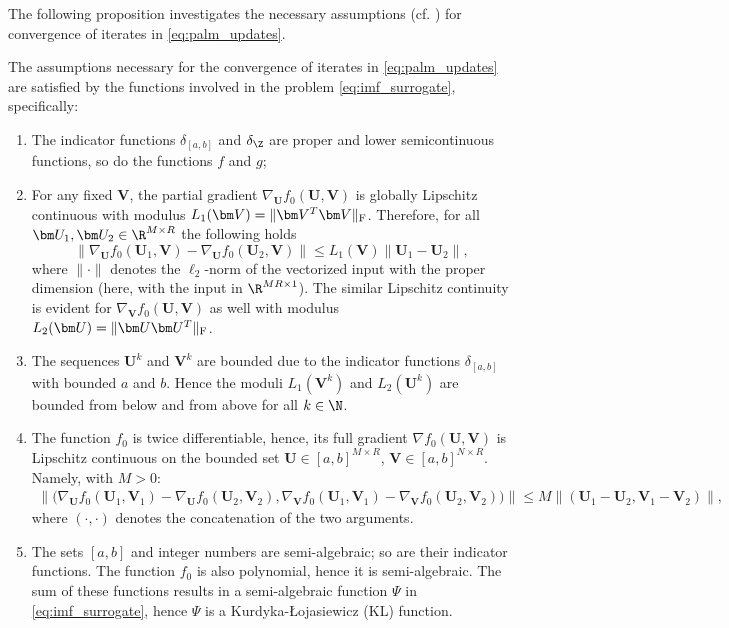 The following proposition investigates the necessary assumptions (cf. \cite[Asm. 1 and Asm. 2]{bolte2014proximal}) for convergence of iterates in \eqref{eq:palm_updates}.
\begin{prop}\label{prop:assumptions}
    The assumptions necessary for the convergence of iterates in \eqref{eq:palm_updates} are satisfied by the functions involved in the problem \eqref{eq:imf_surrogate}, specifically:
    \begin{enumerate}
        \item The indicator functions $\delta_{[a,b]}$ and $\delta_\Z$ are proper and lower semicontinuous functions, so do the functions $f$ and $g$;
        \item For any fixed $\bm V$, the partial gradient $\nabla_{\bm U} f_0(\bm U, \bm V)$ is globally Lipschitz continuous with modulus $L_1(\bm V) = \|\bm V^T \bm V\|_{\rm F}$. Therefore, for all $\bm U_1,\bm U_2 \in \R^{M\times R}$ the following holds
              \begin{equation*}
                  \|\nabla_{\bm U} f_0(\bm U_1, \bm V) - \nabla_{\bm U} f_0(\bm U_2, \bm V)\| \leq L_1(\bm V) \|\bm U_1 - \bm U_2\|,
              \end{equation*}
              where $\|\cdot\|$ denotes the $\ell_2$-norm of the vectorized input with the proper dimension (here, with the input in $\R^{MR\times 1}$).
              The similar Lipschitz continuity is evident for $\nabla_{\bm V} f_0(\bm U, \bm V)$ as well with modulus $L_2(\bm U) = \|\bm U \bm U^T\|_{\rm F}$.
        \item The sequences $\bm U^k$ and $\bm V^k$ are bounded due to the indicator functions $\delta_{[a,b]}$ with bounded $a$ and $b$. Hence the moduli $L_1(\bm V^k)$ and $L_2(\bm U^k)$ are bounded from below and from above for all $k\in\N$.
        \item The function $f_0$ is twice differentiable, hence, its full gradient $\nabla f_0(\bm U,\bm V)$ is Lipschitz continuous on the bounded set $\bm U \in [a,b]^{M\times R}$, $\bm V \in [a,b]^{N\times R}$. Namely, with $M > 0$:
              \begin{align*}
                  \|\big(\nabla_{\bm U} f_0(\bm U_1, \bm V_1) - \nabla_{\bm U}  f_0(\bm U_2, \bm V_2),                             
                  \nabla_{\bm V} f_0(\bm U_1, \bm V_1)                          - \nabla_{\bm V} f_0(\bm U_2, \bm V_2)\big)\|      
                                                                                \leq M \|(\bm U_1 - \bm U_2, \bm V_1 - \bm V_2)\|,
              \end{align*}
              where $(\cdot,\cdot)$ denotes the concatenation of the two arguments.
        \item The sets $[a,b]$ and integer numbers are semi-algebraic; so are their indicator functions. The function $f_0$ is also polynomial, hence it is semi-algebraic. The sum of these functions results in a semi-algebraic function $\Psi$ in \eqref{eq:imf_surrogate}, hence $\Psi$ is a Kurdyka-Łojasiewicz (KL) function.
    \end{enumerate}
\end{prop}
